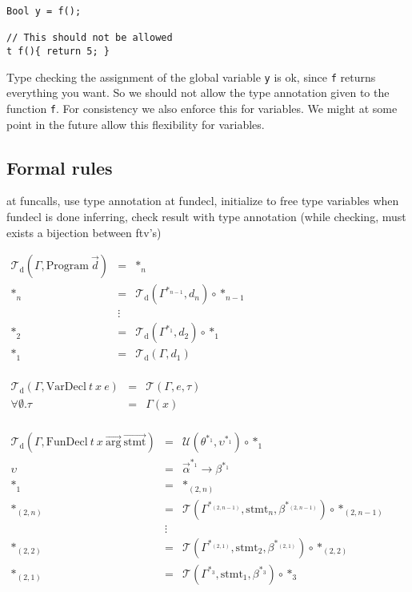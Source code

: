 \documentclass[14pt]{amsart}
\begin{document}
\begin{lstlisting}
Bool y = f();

// This should not be allowed
t f(){ return 5; }
\end{lstlisting}

Type checking the assignment of the global variable \texttt{y} is ok, since \texttt{f} returns everything you want. So we should not allow the type annotation given to the function \texttt{f}. For consistency we also enforce this for variables. We might at some point in the future allow this flexibility for variables.

\subsection{Formal rules}
at funcalls, use type annotation
at fundecl, initialize to free type variables
when fundecl is done inferring, check result with type annotation (while checking, must exists a bijection between ftv's)

\newcommand{\T}{\mathcal{T}}
\newcommand{\U}{\mathcal{U}}
\newcommand{\s}{\ast}
\newcommand{\sn}[1]{{\s_{#1}}}

	
$\begin{array}{rcl}
	\T_{\mbox{d}}(\Gamma, \mbox{Program}~\vec{d}) & = & \s_n \\
	\sn{n} & = & \T_{\mbox{d}}(\Gamma^{\sn{n-1}}, d_n) \circ \sn{n-1} \\
	& \vdots & \\
	\sn{2} & = & \T_{\mbox{d}}(\Gamma^{\sn{1}}, d_2) \circ \sn{1} \\
	\sn{1} & = & \T_{\mbox{d}}(\Gamma, d_1) \\
\end{array}$

$\begin{array}{rcl}
	\T_{\mbox{d}}(\Gamma, \mbox{VarDecl}~t~x~e) & = & \T(\Gamma, e, \tau) \\
	\forall \emptyset . \tau	& = & \Gamma(x) \\
\end{array}$

$\begin{array}{rcl}
	\T_{\mbox{d}}(\Gamma, \mbox{FunDecl}~t~x~\vec{\mbox{arg}}~\vec{\mbox{stmt}}) & = & \U(\theta^\sn{1}, \upsilon^\sn{1}) \circ \sn{1} \\
	\upsilon	& = & \vec{\alpha}^\sn{1} \rightarrow \beta^\sn{1} \\
	\sn{1}		& = & \sn{(2,n)} \\
	\sn{(2,n)}	& = & \T(\Gamma^\sn{(2,n-1)}, \mbox{stmt}_n, \beta^\sn{(2,n-1)}) \circ \sn{(2,n-1)} \\
	& \vdots & \\
	\sn{(2,2)}	& = & \T(\Gamma^\sn{(2,1)}, \mbox{stmt}_2, \beta^\sn{(2,1)}) \circ \sn{(2,2)} \\
	\sn{(2,1)}	& = & \T(\Gamma^\sn{3}, \mbox{stmt}_1, \beta^\sn{3}) \circ \sn{3} \\
	
	
\end{array}$
\end{document}
